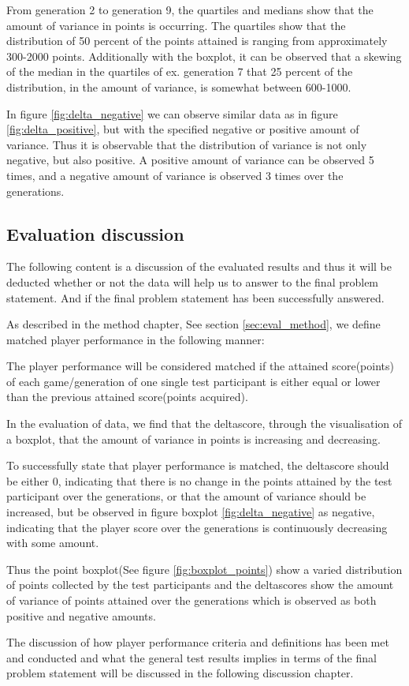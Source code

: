From generation 2 to generation 9, the quartiles and medians show that the amount of variance in points is occurring. The quartiles show that the distribution of 50  percent of the points attained is ranging from approximately 300-2000 points. Additionally with the boxplot, it can be observed that a skewing of the median in the quartiles of ex. generation 7 that 25 percent of the distribution, in the amount of variance, is somewhat between 600-1000.

In figure \ref{fig:delta_negative} we can observe similar data as in figure \ref{fig:delta_positive}, but with the specified negative or positive amount of variance. Thus it is observable that the distribution of variance is not only negative, but also positive. A positive amount of variance can be observed 5 times, and a negative amount of variance is observed 3 times over the generations.

\newpage
\subsection{Evaluation discussion}
The following content is a discussion of the evaluated results and thus it will be deducted whether or not the data will help us to answer to the final problem statement. And if the final problem statement has been successfully answered.

As described in the method chapter, See section \ref{sec:eval_method}, we define matched player performance in the following manner:

The player performance will be considered matched if the attained score(points) of each game/generation of one single test participant is either equal or lower than the previous attained score(points acquired).

In the evaluation of data, we find that the deltascore, through the visualisation of a boxplot, that the amount of variance in points is increasing and decreasing.

To successfully state that player performance is matched, the deltascore should be either 0, indicating that there is no change in the points attained by the test participant over the generations, or that the amount of variance should be increased, but be observed in figure boxplot \ref{fig:delta_negative} as negative, indicating that the player score over the generations is continuously decreasing with some amount.

Thus the point boxplot(See figure \ref{fig:boxplot_points}) show a varied distribution of points collected by the test participants and the deltascores show the amount of variance of points attained over the generations which is observed as both positive and negative amounts.

The discussion of how player performance criteria and definitions has been met and conducted and what the general test results implies in terms of the final problem statement will be discussed in the following discussion chapter.

